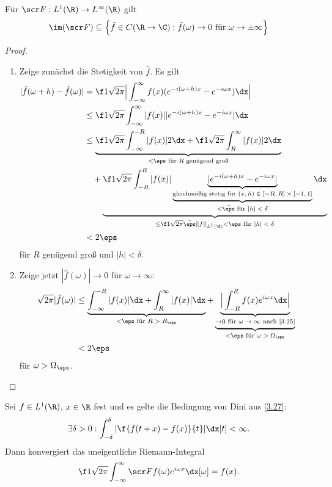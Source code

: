 \begin{st} \label{4.25}
	Für $\scr F: L^1(\R) \to L^\infty(\R)$ gilt
	\[
		\im (\scr F) \subset \Big\{ \hat f \in C(\R \to \C) : \hat f(\omega) \to 0 \text{ für } \omega \to \pm \infty \Big\}
	\]
	\begin{proof}
		\begin{enumerate}[1)]
			\item
				Zeige zunächst die Stetigkeit von $\hat f$.
				Es gilt
				\begin{align*}
					| \hat f(\omega + h) - \hat f(\omega) |
					&= \f 1{\sqrt{2\pi}} \Big| \int_{-\infty}^\infty f(x) ( e^{-i(\omega + h)x} - e^{-i \omega x} ) \dx \Big| \\
					&\le \f 1{\sqrt{2\pi}} \int_{-\infty}^\infty |f(x)| | e^{-i(\omega + h)x} - e^{-i \omega x} | \dx \\
					&\le \underbrace{\f 1{\sqrt{2\pi}} \int_{-\infty}^{-R} |f(x)| 2 \dx
						+ \f 1{\sqrt{2\pi}} \int_{R}^{\infty} |f(x)| 2 \dx}_{< \eps \text{ für $R$ genügend groß}} \\
						&\quad + \underbrace{\f 1{\sqrt{2\pi}} \int_{-R}^{R} |f(x)| \underbrace{\underbrace{|e^{-i(\omega + h) x} - e^{-i \omega x}|}_{\text{gleichmäßig stetig für $(x,h) \in [-R,R] \times [-1,1]$}}}_{< \tilde \eps \text{ für $|h|<\delta$}} \dx}_{\le \f 1{\sqrt{2\pi}} \tilde \eps \|f\|_{L^1(\R)} < \eps \text{ für $|h|<\delta$}} \\
					&< 2\eps
				\end{align*}
				für $R$ genügend groß und $|h| < \delta$.
			\item
				Zeige jetzt $|\hat f(\omega)| \to 0$ für $\omega \to \infty$:
				\begin{align*}
					\sqrt{2\pi} |\hat f(\omega)|
					&\le  \underbrace{\int_{-\infty}^{-R} |f(x)| \dx + \int_{R}^{\infty} |f(x)| \dx}_{<\eps \text{ für $R > R_\eps$}}
					+ \underbrace{\underbrace{\Big| \int_{-R}^R f(x) e^{i\omega x} \dx \Big|}_{\to 0 \text{ für $\omega \to \infty$ nach \ref{3.25}}}}_{<\eps \text{ für $\omega > \Omega_\eps$}} \\
					&< 2\eps
				\end{align*}
				für $\omega > \Omega_\eps$.
		\end{enumerate}
	\end{proof}
\end{st}

\begin{st} \label{4.26}
	Sei $f \in L^1(\R)$, $x \in \R$ fest und es gelte die Bedingung von Dini aus \ref{3.27}:
	\[
		\exists \delta > 0 : \int_{-\delta}^{\delta} | \f {f(t+x)-f(x)}{t} | \dx[t] < \infty.
	\]
	Dann konvergiert das uneigentliche Riemann-Integral
	\[
		\f 1{\sqrt{2\pi}} \int_{-\infty}^\infty \scr F f(\omega) e^{i \omega x} \dx[\omega] = f(x).
	\]
\end{st}


